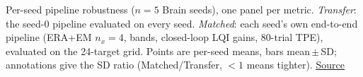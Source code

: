 Per-seed pipeline robustness ($n=5$ Brain seeds), one panel per metric. \emph{Transfer}: the seed-0 pipeline evaluated on every seed. \emph{Matched}: each seed's own end-to-end pipeline (ERA+EM $n_x=4$, bands, closed-loop LQI gains, 80-trial TPE), evaluated on the 24-target grid. Points are per-seed means, bars mean\,$\pm$\,SD; annotations give the SD ratio (Matched/Transfer, ${<}1$ means tighter). \href{https://github.com/tahmidazam/gg4/blob/main/notebooks/cartesian_control_pipeline_robustness/cartesian_control_pipeline_robustness.ipynb}{\underline{Source}}%